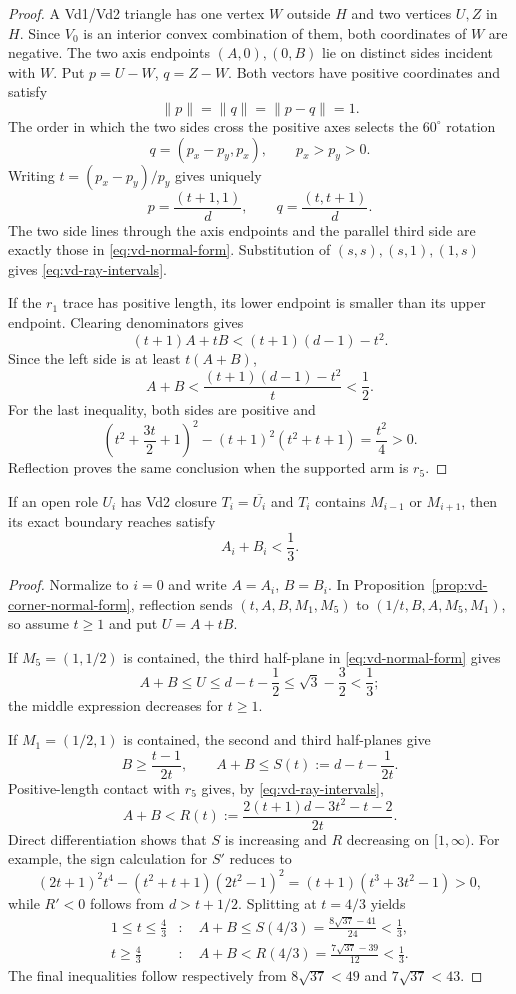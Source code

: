 \begin{proof}
A Vd1/Vd2 triangle has one vertex $W$ outside $H$ and two vertices $U,Z$
in $H$.  Since $V_0$ is an interior convex combination of them, both
coordinates of $W$ are negative.  The two axis endpoints $(A,0),(0,B)$ lie
on distinct sides incident with $W$.  Put $p=U-W$, $q=Z-W$.  Both vectors
have positive coordinates and satisfy
\[
 \lVert p\rVert=\lVert q\rVert=\lVert p-q\rVert=1.
\]
The order in which the two sides cross the positive axes selects the
$60^\circ$ rotation
\[
 q=(p_x-p_y,p_x),\qquad p_x>p_y>0.
\]
Writing $t=(p_x-p_y)/p_y$ gives uniquely
\[
 p=\frac{(t+1,1)}d,\qquad q=\frac{(t,t+1)}d.
\]
The two side lines through the axis endpoints and the parallel third side
are exactly those in \eqref{eq:vd-normal-form}.  Substitution of
$(s,s),(s,1),(1,s)$ gives \eqref{eq:vd-ray-intervals}.

If the $r_1$ trace has positive length, its lower endpoint is smaller than
its upper endpoint.  Clearing denominators gives
\[
 (t+1)A+tB<(t+1)(d-1)-t^2.
\]
Since the left side is at least $t(A+B)$,
\[
 A+B<\frac{(t+1)(d-1)-t^2}{t}<\frac12.
\]
For the last inequality, both sides are positive and
\[
 \left(t^2+\frac{3t}{2}+1\right)^2
 -(t+1)^2(t^2+t+1)=\frac{t^2}{4}>0.
\]
Reflection proves the same conclusion when the supported arm is $r_5$.
\end{proof}

\begin{lemma}
\label{lem:vd2-neighbor-midpoint-cap}
If an open role $U_i$ has Vd2 closure $T_i=\overline{U_i}$ and $T_i$
contains $M_{i-1}$ or $M_{i+1}$, then its
exact boundary reaches satisfy
\[
 A_i+B_i<\frac13.
\]
\end{lemma}

\begin{proof}
Normalize to $i=0$ and write $A=A_i$, $B=B_i$.  In
Proposition~\ref{prop:vd-corner-normal-form}, reflection sends
$(t,A,B,M_1,M_5)$ to $(1/t,B,A,M_5,M_1)$, so assume $t\ge1$ and put
$U=A+tB$.

If $M_5=(1,1/2)$ is contained, the third half-plane in
\eqref{eq:vd-normal-form} gives
\[
 A+B\le U\le d-t-\frac12\le\sqrt3-\frac32<\frac13;
\]
the middle expression decreases for $t\ge1$.

If $M_1=(1/2,1)$ is contained, the second and third half-planes give
\[
 B\ge\frac{t-1}{2t},\qquad
 A+B\le S(t):=d-t-\frac1{2t}.
\]
Positive-length contact with $r_5$ gives, by
\eqref{eq:vd-ray-intervals},
\[
 A+B<R(t):=\frac{2(t+1)d-3t^2-t-2}{2t}.
\]
Direct differentiation shows that $S$ is increasing and $R$ decreasing on
$[1,\infty)$.  For example, the sign calculation for $S'$ reduces to
\[
 (2t+1)^2t^4-(t^2+t+1)(2t^2-1)^2
 =(t+1)(t^3+3t^2-1)>0,
\]
while $R'<0$ follows from $d>t+1/2$.  Splitting at $t=4/3$ yields
\[
 \begin{aligned}
 1\le t\le\frac43&:\quad
 A+B\le S(4/3)=\frac{8\sqrt{37}-41}{24}<\frac13,\\
 t\ge\frac43&:\quad
 A+B<R(4/3)=\frac{7\sqrt{37}-39}{12}<\frac13.
 \end{aligned}
\]
The final inequalities follow respectively from
$8\sqrt{37}<49$ and $7\sqrt{37}<43$.
\end{proof}

